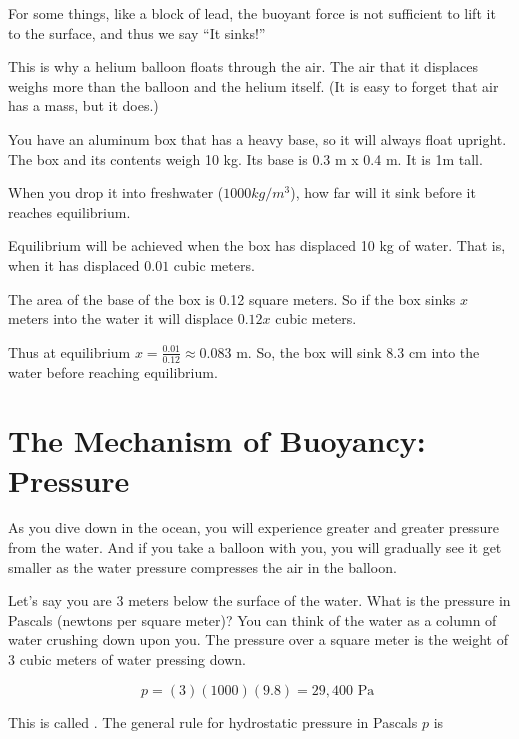 For some things, like a block of lead, the buoyant force is not
 sufficient to lift it to the surface, and thus we say ``It sinks!''

This is why a helium balloon floats through the air. The air
that it displaces weighs more than the balloon and the helium itself. (It is easy to forget that air has a mass, but it does.)

\begin{Exercise}[title={Buoyancy}, label=buoyancy]
  You have an aluminum box that has a heavy base, so it will always
  float upright. The box and its contents weigh 10 kg. Its base is 0.3 m x 0.4 m. It is 1m tall.

  When you drop it into freshwater ($1000 kg/m^3$), how far will it sink
  before it reaches equilibrium.

\end{Exercise}
\begin{Answer}[ref=buoyancy]
  Equilibrium will be achieved when the box has displaced 10 kg of water. That is, when it has displaced $0.01$ cubic meters.

  The area of the base of the box is 0.12 square meters.  So if the
  box sinks $x$ meters into the water it will displace $0.12 x$ cubic
  meters.

  Thus at equilibrium $x = \frac{0.01}{0.12} \approx 0.083$ m.  So,
  the box will sink 8.3 cm into the water before reaching equilibrium.
\end{Answer}

\section{The Mechanism of Buoyancy: Pressure}

As you dive down in the ocean, you will experience greater and
greater pressure from the water. And if you take a balloon with you, you
will gradually see it get smaller as the water pressure compresses the
air in the balloon.

Let's say you are 3 meters below the surface of the water. What is the
pressure in Pascals (newtons per square meter)? You can think of the
water as a column of water crushing down upon you. The pressure over
a square meter is the weight of 3 cubic meters of water pressing down.

$$p = (3)(1000)(9.8) = 29,400 \text{ Pa }$$

This is called . The general rule for
hydrostatic pressure in Pascals $p$ is

